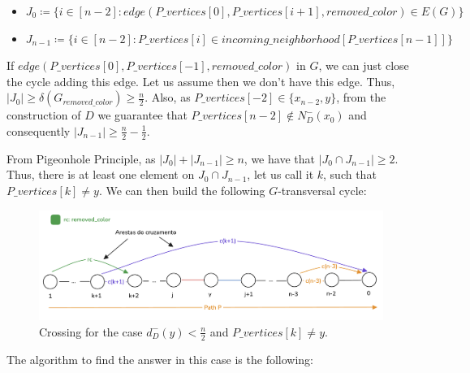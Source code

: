 \begin{itemize}
    \item $J_0 \coloneqq \{i \in [n-2]: edge(P\_vertices[0], P\_vertices[i + 1], removed\_color) \in E(G)\}$
    \item $J_{n-1} \coloneqq \{i \in [n-2]: P\_vertices[i] \in incoming\_neighborhood[P\_vertices[n - 1]]\}$
\end{itemize}


If $edge(P\_vertices[0], P\_vertices[-1], removed\_color)$ in $G$, we can just 
close the cycle adding this edge. Let us assume then we don't have this edge. 
Thus, $|J_0| \geq \delta(G_{removed\_color}) \geq \frac{n}{2}$. Also, as $P\_vertices[-2] \in \{x_{n-2}, y\}$, 
from the construction of $D$ we guarantee that $P\_vertices[n-2] \notin N^-_D(x_0)$
and consequently $|J_{n-1}| \geq \frac{n}{2} - \frac{1}{2}$.

From Pigeonhole Principle, as $|J_0| + |J_{n-1}| \geq n$, we have that $|J_0 \cap J_{n-1}| \geq 2$. Thus,
there is at least one element on $J_0 \cap J_{n-1}$, let us call it $k$, such that $P\_vertices[k] \neq y$.
We can then build the following $G$-transversal cycle:

\begin{figure}[H]
    \centering
    \includegraphics[width=1\textwidth]{figuras/cycle_n-1_cruzamento_not_y.png}
    \caption{Crossing for the case $d^-_D(y) < \frac{n}{2}$ and $P\_vertices[k] \neq y$.}
    \label{fig:cycle_n-1_cruzamento_not_y}
\end{figure}

The algorithm to find the answer in this case is the following:

